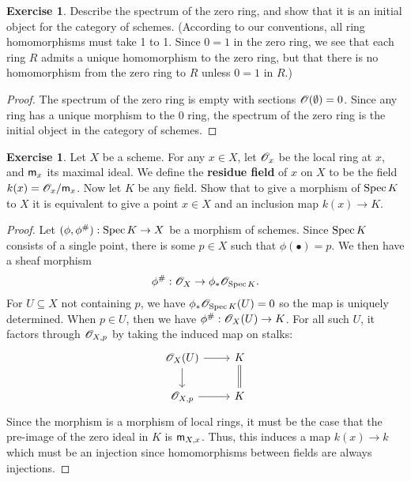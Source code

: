 \documentclass[]{pcmi}
\theoremstyle{plain}
\theoremstyle{definition}
\newtheorem{Exercise}[equation]{Exercise}
\theoremstyle{remark}
\begin{document}
\begin{Exercise}
    Describe the spectrum of the zero ring, and show that it is an initial object for the category of schemes. (According to our conventions, all ring homomorphisms must take 1 to 1. Since $0 = 1$ in the zero ring, we see that each ring $R$ admits a unique homomorphism to the zero ring, but that there is no homomorphism from the zero ring to $R$ unless $0 = 1$ in $R$.)
\end{Exercise}

\begin{proof}
    The spectrum of the zero ring is empty with sections $\mathscr{O}(\emptyset) = 0$. Since any ring has a unique morphism to the $0$ ring, the spectrum of the zero ring is the initial object in the category of schemes. 
\end{proof}

\begin{Exercise}
    Let $X$ be a scheme. For any $x \in X$, let $\mathscr{O}_x$ be the local ring at $x$, and $\mathsf{m}_x$ its maximal ideal. We define the \textbf{residue field} of $x$ on $X$ to be the field $k(x) = \mathscr{O}_x / \mathsf{m}_x$. Now let $K$ be any field. Show that to give a morphism of $\operatorname{Spec} K$ to $X$ it is equivalent to give a point $x \in X$ and an inclusion map $k(x) \to K$. 
\end{Exercise}

\begin{proof}
    Let $(\phi, \phi^{\#}): \operatorname{Spec} K \to X$ be a morphism of schemes. Since $\operatorname{Spec} K$ consists of a single point, there is some $p \in X$ such that $\phi(\bullet) = p$. We then have a sheaf morphism 
    \[
        \phi^{\#} : \mathscr{O}_X \to \phi_* \mathscr{O}_{\operatorname{Spec} K}. 
    \]
    For $U \subseteq X$ not containing $p$, we have $\phi_* \mathscr{O}_{\operatorname{Spec} K}(U) = 0$ so the map is uniquely determined. When $p \in U$, then we have $\phi^{\#} : \mathscr{O}_X(U) \to K$. For all such $U$, it factors through $\mathscr{O}_{X, p}$ by taking the induced map on stalks:
    \[
        \begin{tikzcd}
            {\mathscr{O}_X(U)} & K \\
            {\mathscr{O}_{X, p}} & K
            \arrow[from=1-1, to=1-2]
            \arrow[from=1-1, to=2-1]
            \arrow[Rightarrow, no head, from=1-2, to=2-2]
            \arrow[from=2-1, to=2-2]
        \end{tikzcd}
    \]
    Since the morphism is a morphism of local rings, it must be the case that the pre-image of the zero ideal in $K$ is $\mathsf{m}_{X, x}$. Thus, this induces a map $k(x) \to k$ which must be an injection since homomorphisms between fields are always injections.
\end{proof}
\end{document}

